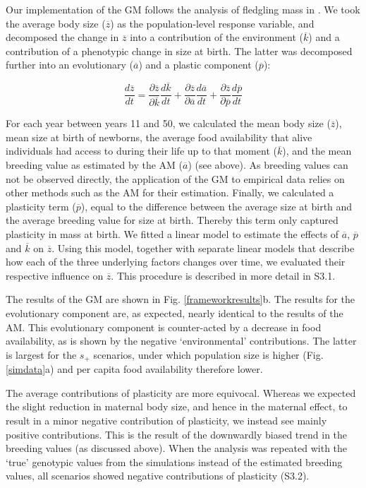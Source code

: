 Our implementation of the GM follows the analysis of fledgling mass in \cite{Ellner2011}. We took the average body size ($\overline z$) as the population-level response variable, and decomposed the change in $\overline z$ into a contribution of the environment ($\overline k$) and a contribution of a phenotypic change in size at birth. The latter was decomposed further into an evolutionary ($\overline a$) and a plastic component ($\overline p$):

\begin{equation}
\frac{d \overline{z}}{dt} = \frac{\partial \overline{z}}{\partial \overline{k}} \frac{d\overline{k}}{dt} + \frac{\partial \overline{z}}{\partial \overline{a}}\frac{d \overline{a}}{dt} + \frac{\partial \overline{z}}{\partial \overline{p}}\frac{d\overline{p}}{dt} 
\end{equation}

For each year between years 11 and 50, we calculated the mean body size ($\overline z$), mean size at birth of newborns, the average food availability that alive individuals had access to during their life up to that moment ($\overline k$), and the mean breeding value as estimated by the AM ($\overline a$) (see above). As breeding values can not be observed directly, the application of the GM to empirical data relies on other methods such as the AM for their estimation. Finally, we calculated a plasticity term ($\overline p$), equal to the difference between the average size at birth and the average breeding value for size at birth. Thereby this term only captured plasticity in mass at birth. 
We fitted a linear model to estimate the effects of $\overline a$, $\overline p$ and $\overline k$ on $\overline z$. Using this model, together with separate linear models that describe how each of the three underlying factors changes over time, we evaluated their respective influence on $\overline z$. This procedure is described in more detail in S3.1.

The results of the GM are shown in Fig. \ref{frameworkresults}b. The results for the evolutionary component are, as expected, nearly identical to the results of the AM. This evolutionary component is counter-acted by a decrease in food availability, as is shown by the negative `environmental' contributions. The latter is largest for the $s_+$ scenarios, under which population size is higher (Fig. \ref{simdata}a) and per capita food availability therefore lower. 

The average contributions of plasticity are more equivocal. Whereas we expected the slight reduction in maternal body size, and hence in the maternal effect, to result in a minor negative contribution of plasticity, we instead see mainly positive contributions. This is the result of the downwardly biased trend in the breeding values (as discussed above). When the analysis was repeated with the `true' genotypic values from the simulations instead of the estimated breeding values, all scenarios showed negative contributions of plasticity (S3.2).

